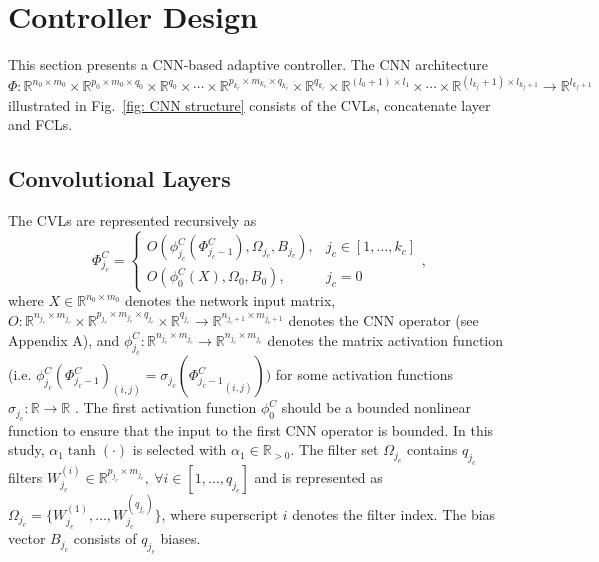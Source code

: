 \documentclass[letterpaper, 10 pt, conference]{ieeeconf}  %
\begin{document}
\section{Controller Design}\label{label: CNN declare}

This section presents a CNN-based adaptive controller. 
The CNN architecture $\Phi:\mathbb{R}^{n_0\times m_0}\times \mathbb{R}^{p_0\times m_0\times q_0}\times \mathbb{R}^{q_0} \times \cdots \times \mathbb{R}^{p_{k_c}\times m_{k_c}\times q_{k_c}}\times \mathbb{R}^{q_{k_c}}\times \mathbb{R}^{(l_0+1)\times l_1}\times \cdots \times \mathbb{R}^{(l_{k_f}+1)\times l_{k_f+1}} \to \mathbb{R}^{l_{k_f+1}}$ illustrated in Fig.~\ref{fig: CNN structure} consists of the CVLs, concatenate layer and FCLs.


\subsection{Convolutional Layers}
The CVLs are represented recursively as
\begin{equation}
    \Phi^C_{j_c} = 
    \begin{cases}
        O(\phi^C_{j_c}(\Phi^C_{j_c-1}),\Omega_{j_c},B_{j_c}),&
        j_c\in[1,\dots,k_c]\\
        O(\phi^C_0(X),\Omega_0,B_0),&j_c=0
    \end{cases},
\end{equation}
where $X\in\mathbb{R}^{n_0\times m_0}$ denotes the network input matrix, $O:\mathbb{R}^{n_{{j_c}}\times {m_{j_c}}} \times \mathbb{R}^{p_{j_c}\times m_{j_c} \times q_{j_c} }\times \mathbb{R}^{q_{j_c}}\to \mathbb{R}^{n_{j_c+1}\times m_{j_c+1}}$ denotes the CNN operator (see Appendix A), and $\phi^C_{j_c}:  \mathbb{R}^{n_{j_c}\times m_{j_c}} \to  \mathbb{R}^{n_{j_c}\times m_{j_c}}$ denotes the matrix activation function (i.e. $ {\phi^C_{j_c}}(\Phi^C_{j_c-1})_{(i,j)}= \sigma_{j_c}({\Phi^C_{j_c-1}}_{(i,j)}))$ for some activation functions $\sigma_{j_c}:\mathbb{R}\to\mathbb{R}$ .
The first activation function $\phi^C_0$ should be a bounded nonlinear function to ensure that the input to the first CNN operator is bounded. In this study, $\alpha_1\tanh(\cdot)$ is selected with $\alpha_1\in\mathbb{R}_{>0}$.
The filter set $\Omega_{j_c}$ contains $q_{j_c}$ filters $W^{(i)}_{j_c}\in\mathbb{R}^{p_{j_c}\times m_{j_c}},\ \forall i\in[1,\dots, q_{j_c}]$ and is represented as $\Omega_{j_c} = \{W^{(1)}_{j_c},\dots,W^{(q_{j_c})}_{j_c}\}$, where superscript $i$ denotes the filter index. The bias vector $B_{j_c}$ consists of $q_{j_c}$ biases. 
\end{document}
